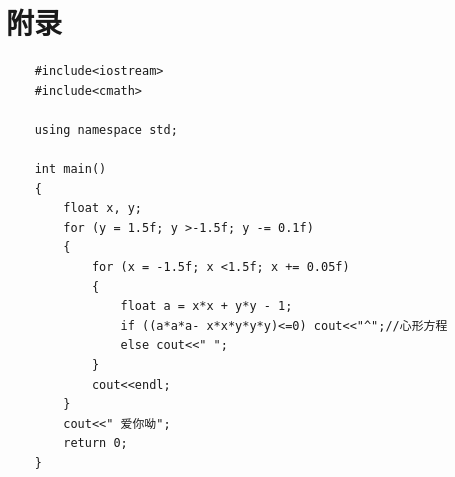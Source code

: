 \documentclass[12pt]{ctexart} %
\begin{document}
\newpage



\newpage
\section*{附录}
\begin{verbatim}
    #include<iostream>
    #include<cmath>
    
    using namespace std;
    
    int main()
    {
        float x, y;
        for (y = 1.5f; y >-1.5f; y -= 0.1f)
        {
            for (x = -1.5f; x <1.5f; x += 0.05f)
            {
                float a = x*x + y*y - 1;
                if ((a*a*a- x*x*y*y*y)<=0) cout<<"^";//心形方程
                else cout<<" ";
            }
            cout<<endl;
        }
        cout<<" 爱你呦";
        return 0;
    }
\end{verbatim}
\end{document}
